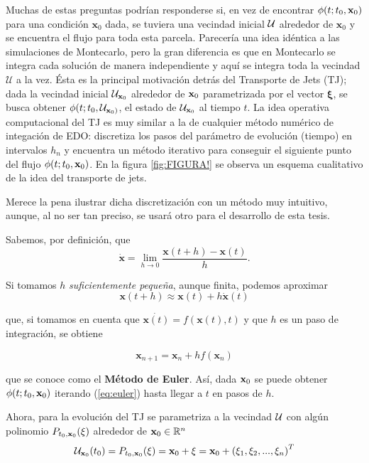 Muchas de estas preguntas podrían responderse si, en vez de encontrar $\phi(t;t_0,\mathbf{x}_0)$ para una condición $\mathbf{x}_0$ dada, se tuviera una vecindad inicial $\mathcal{U}$ alrededor de $\mathbf{x}_0$ y se encuentra el flujo para toda esta parcela. Parecería una idea idéntica a las simulaciones de Montecarlo, pero la gran diferencia es que en Montecarlo se integra cada solución de manera independiente y aquí se integra toda la vecindad $\mathcal{U}$ a la vez. Ésta es la principal motivación detrás del Transporte de Jets (TJ); dada la vecindad inicial $\mathcal{U}_{\mathbf{x}_0}$ alrededor de $\mathbf{x}_0$ parametrizada por el vector $\mathbf{\xi}$, se busca obtener $\phi(t;t_0,\mathcal{U}_{\mathbf{x}_0)}$, el estado de $\mathcal{U}_{\mathbf{x}_0}$ al tiempo $t$. La idea operativa computacional del TJ es muy similar a la de cualquier método numérico de integación de EDO: discretiza los pasos del parámetro de evolución (tiempo) en intervalos $h_n$ y encuentra un método iterativo para conseguir el siguiente punto del flujo $\phi(t;t_0,\mathbf{x}_0)$. En la figura \ref{fig:FIGURA!} se observa un esquema cualitativo de la idea del transporte de jets.


Merece la pena ilustrar dicha discretización con un método muy intuitivo, aunque, al  no ser tan preciso, se usará otro para el desarrollo de esta tesis.

Sabemos, por definición, que 
\begin{equation*}
\dot{\mathbf{x}} = \lim_{h\to 0} \frac{\mathbf{x}(t+h)-\mathbf{x}(t)}{h}.
\end{equation*}  

Si tomamos $h$ \textit{suficientemente pequeña}, aunque finita, podemos aproximar
\begin{equation*}
\mathbf{x}(t+h) \approx \mathbf{x}(t) + h \dot{\mathbf{x}}(t)
\end{equation*}

que, si tomamos en cuenta que $\dot{\mathbf{x}(t)} = f(\mathbf{x}(t),t)$ y que $h$ es un paso de integración, se obtiene
 
\begin{equation}
\mathbf{x}_{n+1} = \mathbf{x}_n + h f(\mathbf{x}_n)
\label{eq:euler} 
\end{equation}

que se conoce como el \textbf{Método de Euler}. Así, dada $\mathbf{x}_0$ se puede obtener $\phi(t;t_0,\mathbf{x}_0)$ iterando (\ref{eq:euler}) hasta llegar a $t$ en pasos de $h$.

Ahora, para la evolución del TJ se parametriza a la vecindad $\mathcal{U}$ con algún polinomio $P_{t_0,\mathbf{x}_0}(\xi)$ alrededor de $\mathbf{x}_0 \in \mathbb{R}^n$ 
\begin{equation*}
\mathcal{U}_{\mathbf{x}_0}(t_0) = P_{t_0,\mathbf{x}_0}(\xi) = \mathbf{x}_0 + \xi = \mathbf{x}_0 + \left( \xi_1, \xi_2, ..., \xi_n \right)^T
\end{equation*} 

